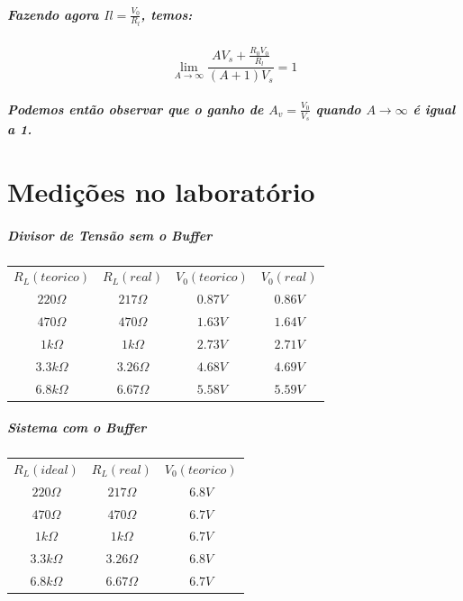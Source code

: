 \documentclass[12pt,twoside, a4paper, twocolumn]{article}
\begin{document}
\subparagraph*{Fazendo agora $Il = \frac{V_0}{R_l}$, temos:}

\begin{equation}
    \lim_{A \to \infty} \frac{A V_s + \frac{R_0 V_0}{R_l}}{(A+1) V_s} = 1
\end{equation}

\subparagraph*{Podemos então observar que o ganho de $A_v = \frac{V_0}{V_s}$ quando $A \to \infty$ é igual a 1. }







\section{Medições no laboratório}



\subparagraph*{Divisor de Tensão sem o Buffer}

\begin{center}
    \begin{tabular}{ |c|c|c|c| }
        \hline
        $R_L (teorico) $  & $R_L (real)$     & $V_0 (teorico)$ & $V_0 (real)$ \\
        $ 220 \varOmega$  & $217 \varOmega$  & $0.87V$         & $0.86V$      \\
        $ 470 \varOmega$  & $470 \varOmega$  & $1.63V$         & $1.64V$      \\
        $ 1k \varOmega$   & $1k \varOmega$   & $2.73V$         & $2.71V$      \\
        $ 3.3k \varOmega$ & $3.26 \varOmega$ & $4.68V$         & $4.69V$      \\
        $ 6.8k \varOmega$ & $6.67 \varOmega$ & $5.58V$         & $5.59V$      \\
        \hline
    \end{tabular}
\end{center}

\subparagraph*{Sistema com o Buffer}

\begin{center}
    \begin{tabular}{ |c|c|c| }
        \hline
        $R_L (ideal) $    & $R_L (real)$     & $V_0 (teorico)$ \\
        $ 220 \varOmega$  & $217 \varOmega$  & $6.8V$          \\
        $ 470 \varOmega$  & $470 \varOmega$  & $6.7V$          \\
        $ 1k \varOmega$   & $1k \varOmega$   & $6.7V$          \\
        $ 3.3k \varOmega$ & $3.26 \varOmega$ & $6.8V$          \\
        $ 6.8k \varOmega$ & $6.67 \varOmega$ & $6.7V$          \\
        \hline
    \end{tabular}
\end{center}
\end{document}
